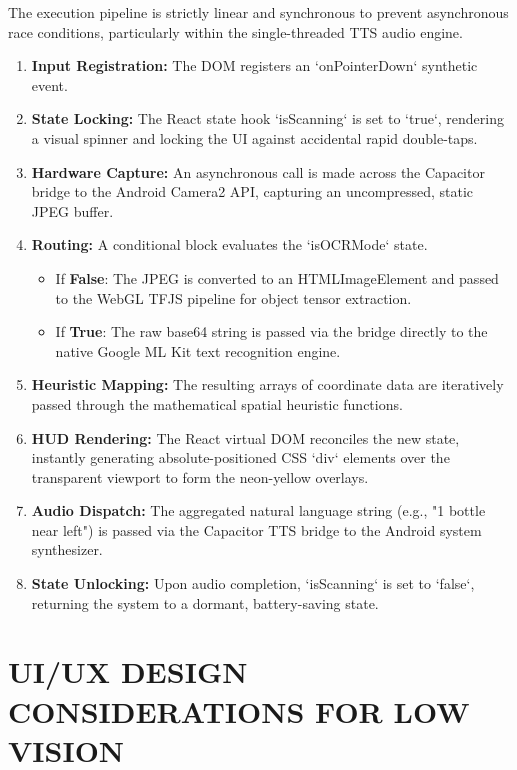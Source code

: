 \documentclass[12pt, a4paper]{report}
\begin{document}
The execution pipeline is strictly linear and synchronous to prevent asynchronous race conditions, particularly within the single-threaded TTS audio engine.
\begin{enumerate}
    \item \textbf{Input Registration:} The DOM registers an `onPointerDown` synthetic event.
    \item \textbf{State Locking:} The React state hook `isScanning` is set to `true`, rendering a visual spinner and locking the UI against accidental rapid double-taps.
    \item \textbf{Hardware Capture:} An asynchronous call is made across the Capacitor bridge to the Android Camera2 API, capturing an uncompressed, static JPEG buffer.
    \item \textbf{Routing:} A conditional block evaluates the `isOCRMode` state.
    \begin{itemize}
        \item If \textbf{False}: The JPEG is converted to an HTMLImageElement and passed to the WebGL TFJS pipeline for object tensor extraction.
        \item If \textbf{True}: The raw base64 string is passed via the bridge directly to the native Google ML Kit text recognition engine.
    \end{itemize}
    \item \textbf{Heuristic Mapping:} The resulting arrays of coordinate data are iteratively passed through the mathematical spatial heuristic functions.
    \item \textbf{HUD Rendering:} The React virtual DOM reconciles the new state, instantly generating absolute-positioned CSS `div` elements over the transparent viewport to form the neon-yellow overlays.
    \item \textbf{Audio Dispatch:} The aggregated natural language string (e.g., "1 bottle near left") is passed via the Capacitor TTS bridge to the Android system synthesizer.
    \item \textbf{State Unlocking:} Upon audio completion, `isScanning` is set to `false`, returning the system to a dormant, battery-saving state.
\end{enumerate}

\chapter{UI/UX DESIGN CONSIDERATIONS FOR LOW VISION}
\end{document}
